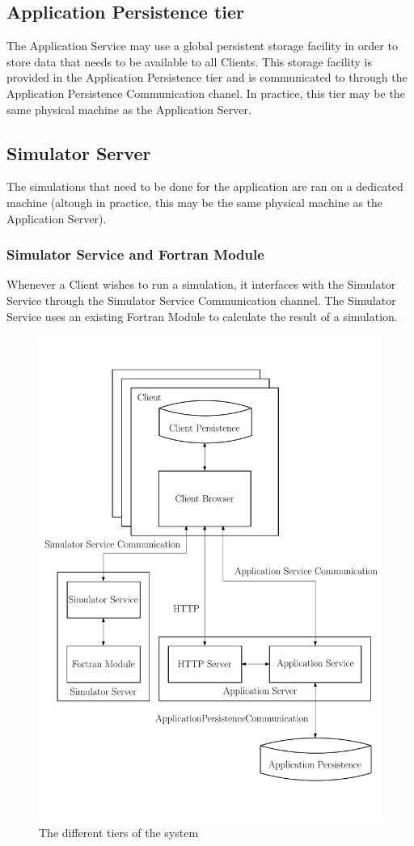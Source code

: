 \subsection{Application Persistence tier}
\label{sec:applicationpersistence}
The Application Service may use a global persistent storage facility in order to store data that needs to be available to all Clients. This storage facility is provided in the Application Persistence tier and is communicated to through the Application Persistence Communication chanel. In practice, this tier may be the same physical machine as the Application Server.

\subsection{Simulator Server}
\label{sec:simulatorserver}
The simulations that need to be done for the application are ran on a dedicated machine (altough in practice, this may be the same physical machine as the Application Server).

\subsubsection{Simulator Service and Fortran Module}
\label{sec:simulatorservice}
Whenever a Client wishes to run a simulation, it interfaces with the Simulator Service through the Simulator Service Communication channel. The Simulator Service uses an existing Fortran Module to calculate the result of a simulation.

\begin{figure}
\label{fig:tierchannel}
  \centering
\includegraphics[scale=0.5]{SoftwareTiers}
\caption{The different tiers of the system}
\end{figure}
